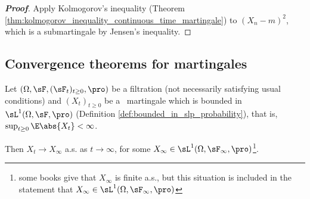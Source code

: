 \begin{proof}[\bf Proof]
Apply Kolmogorov's inequality (Theorem \ref{thm:kolmogorov_inequality_continuous_time_martingale}) to $(X_n -m)^2$, which is a submartingale by Jensen's inequality.
\end{proof}


\subsection{Convergence theorems for martingales}

\begin{theorem}\label{thm:martingale_convergence_continuous}
Let $(\Omega,\sF,(\sF_t)_{t\geq 0}, \pro)$ be a filtration (not necessarily satisfying usual conditions) and $(X_t)_{t \geq  0}$ be a \cadlag\ martingale which is bounded in $\sL^1(\Omega,\sF,\pro)$ (Definition
\ref{def:bounded_in_slp_probability}), that is, $\sup_{t\geq 0}\E\abs{X_t} <\infty$.

Then $X_t \to X_\infty$ a.s. as $t \to \infty$, for some $X_\infty \in \sL^1(\Omega,\sF_\infty,\pro)$\footnote{some books give that $X_\infty$ is finite a.s., but this situation is included in the statement that $X_\infty
\in \sL^1(\Omega,\sF_\infty,\pro)$}.
\end{theorem}

